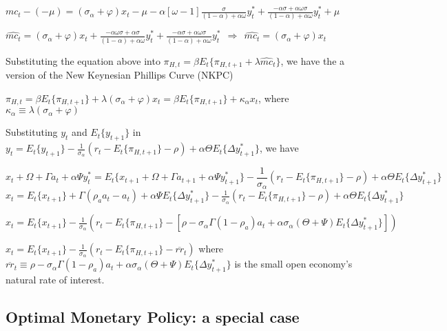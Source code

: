 \documentclass[
]{article}
\begin{document}
\(\displaystyle mc_t-(-\mu)=(\sigma_\alpha+\varphi)x_t - \mu - \alpha \left[ \omega-1 \right] \frac{\sigma}{(1-\alpha)+\alpha \omega} y_t^* + \frac{-\alpha \sigma +\alpha \omega\sigma}{(1-\alpha)+\alpha \omega} y_t^* + \mu\)

\(\displaystyle \widehat{mc_t}=(\sigma_\alpha+\varphi)x_t + \frac{-\alpha \omega \sigma + \alpha \sigma}{(1-\alpha)+\alpha \omega} y_t^* + \frac{-\alpha \sigma +\alpha \omega\sigma}{(1-\alpha)+\alpha \omega} y_t^* \ \ \Rightarrow \ \ \widehat{mc_t}=(\sigma_\alpha+\varphi)x_t\)

Substituting the equation above into
\(\pi_{H,t} = \beta E_t \{ \pi_{H,t+1} + \lambda \widehat{mc}_t\}\), we
have the a version of the New Keynesian Phillips Curve (NKPC)

\(\pi_{H,t} = \beta E_t \{ \pi_{H,t+1}\} + \lambda (\sigma_\alpha+\varphi)x_t = \beta E_t \{ \pi_{H,t+1}\} + \kappa_\alpha x_t\),
where \(\kappa_\alpha \equiv \lambda (\sigma_\alpha+\varphi)\)

Substituting \(y_t\) and \(E_t\{y_{t+1}\}\) in
\(\displaystyle y_t= E_t\{y_{t+1}\} -\frac{1}{\sigma_\alpha}(r_t-E_t\{\pi_{H,t+1}\} -\rho)+ \alpha \Theta E_t\{\Delta y_{t+1}^*\}\),
we have

\[x_t + \Omega+\Gamma a_t+ \alpha \Psi y_t^* = E_t\{x_{t+1} + \Omega+\Gamma a_{t+1}+ \alpha \Psi y_{t+1}^*\} -\frac{1}{\sigma_\alpha}(r_t-E_t\{\pi_{H,t+1}\} -\rho)+ \alpha \Theta  E_t\{\Delta y_{t+1}^*\}\]
\(\displaystyle x_t = E_t\{x_{t+1}\} +\Gamma (\rho_a a_{t}-a_t)+ \alpha \Psi E_t\{\Delta y_{t+1}^*\} -\frac{1}{\sigma_\alpha}(r_t-E_t\{\pi_{H,t+1}\} -\rho)+ \alpha \Theta E_t\{\Delta y_{t+1}^*\}\)

\(\displaystyle x_t = E_t\{x_{t+1}\} -\frac{1}{\sigma_\alpha}(r_t-E_t\{\pi_{H,t+1}\} -[\rho-\sigma_\alpha \Gamma (1-\rho_a)a_t +\alpha \sigma_\alpha(\Theta+\Psi) E_t\{\Delta y_{t+1}^*\}])\)

\(\displaystyle x_t = E_t\{x_{t+1}\} -\frac{1}{\sigma_\alpha}(r_t-E_t\{\pi_{H,t+1}\} -\overline{rr}_t)\)
where
\(\overline{rr}_t \equiv \rho-\sigma_\alpha \Gamma (1-\rho_a)a_t +\alpha \sigma_\alpha(\Theta+\Psi) E_t\{\Delta y_{t+1}^*\}\)
is the small open economy's natural rate of interest.

\hypertarget{optimal-monetary-policy-a-special-case}{%
\subsection{Optimal Monetary Policy: a special
case}\label{optimal-monetary-policy-a-special-case}}
\end{document}
